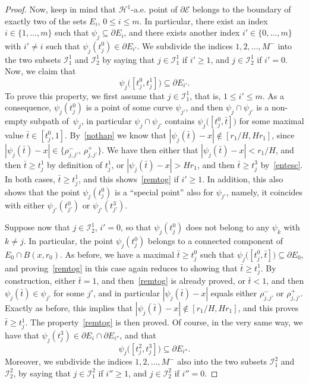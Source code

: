 \documentclass[JEP,XML,SOM,Unicode,NoFloatCountersInSection]{cedram}
\newcommand\E{\mathcal{E}}
\renewcommand\H{\mathcal{H}}
\newcommand\I{\mathcal{I}}
\theoremstyle{plain}
\theoremstyle{definition}
\begin{document}
\begin{proof}
Now, keep in mind that $\H^1$-a.e. point of $\partial\E$ belongs to the boundary of exactly two of the sets $E_i$, $0\leq i \leq m$. In particular, there exist an index $i\in\{1,\dots,m\}$ such that $\psi_j\subseteq \partial E_i$, and there exists another index $i'\in\{0,\dots,m\}$ with $i'\neq i$ such that $\psi_j(t^0_j)\in \partial E_{i'}$. We subdivide the indices $1,2,\dots, M^-$ into the two subsets $\I^1_1$ and $\I^1_2$ by saying that $j\in \I^1_1$ if $i'\geq 1$, and $j\in \I^1_2$ if $i'=0$. Now, we claim that
\begin{equation}\label{remtog}
\psi_j\big( [t^0_j , t^1_j]\big) \subseteq \partial E_{i'}.
\end{equation}
To prove this property, we first assume that $j\in\I^1_1$, that is, $1\leq i' \leq m$. As a con\-se\-quence, $\psi_j(t^0_j)$ is a point of some curve $\psi_{j'}$, and then $\psi_j \cap \psi_{j'}$ is a non-empty subpath of~$\psi_j$, in particular $\psi_j\cap\psi_{j'}$ contains $\psi_j\big( [t^0_j,\bar t] \big)$ for some maximal value $\bar t\in[t^0_j,1]$. By~\eqref{nothap} we know that $|\psi_j(\bar t)-x|\notin [r_1/H,Hr_1]$, since $|\psi_j(\bar t)-x| \in \{\rho^-_{j,j'},\,\rho^+_{j,j'}\}$. We have then either that $|\psi_j(\bar t)-x|<r_1/H$, and then $\bar t\geq t^1_j$ by definition of $t^1_j$, or $|\psi_j(\bar t)-x|>Hr_1$, and then $\bar t\geq t^3_j$ by~\eqref{entesc}. In both cases, $\bar t\geq t^1_j$, and this shows~\eqref{remtog} if $i'\geq 1$. In addition, this also shows that the point $\psi_j(t^0_j)$ is a ``special point'' also for $\psi_{j'}$, namely, it coincides with either $\psi_{j'}(t^0_{j'})$ or $\psi_{j'}(t^3_{j'})$.

Suppose now that $j\in \I^1_2$, \ie $i'=0$, so that $\psi_j(t^0_j)$ does not belong to any $\psi_k$ with $k\neq j$. In particular, the point $\psi_j(t^0_j)$ belongs to a connected component of $E_0\cap B(x,r_0)$. As before, we have a maximal $\bar t\geq t^0_j$ such that $\psi_j\big([t^0_j,\bar t]\big)\subseteq \partial E_0$, and proving~\eqref{remtog} in this case again reduces to showing that $\bar t\geq t^1_j$. By construction, either $\bar t=1$, and then~\eqref{remtog} is already proved, or $\bar t<1$, and then $\psi_j(\bar t)\in \psi_{j'}$ for some $j'$, and in particular $|\psi_j(\bar t)-x|$ equals either $\rho^-_{j,j'}$ or $\rho^+_{j,j'}$. Exactly as before, this implies that $|\psi_j(\bar t)-x|\notin [r_1/H,Hr_1]$, and this proves $\bar t\geq t^1_j$. The property~\eqref{remtog} is then proved. Of course, in the very same way, we have that $\psi_j(t^3_j)\in \partial E_i \cap \partial E_{i''}$, and that
\begin{equation}\label{remtog2}
\psi_j\big( [t^2_j , t^3_j]\big) \subseteq \partial E_{i''}.
\end{equation}
Moreover, we subdivide the indices $1,2,\dots, M^-$ also into the two subsets $\I^2_1$ and $\I^2_2$, by saying that $j\in \I^2_1$ if $i''\geq 1$, and $j \in \I^2_2$ if $i''=0$.


\end{proof}
\end{document}
